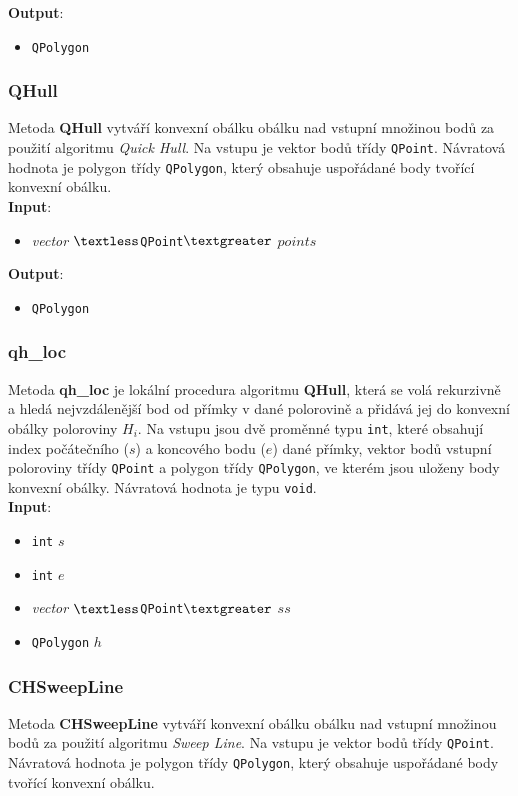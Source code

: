 \documentclass[a4paper, 12pt]{article}
\begin{document}
\textbf{Output}:
\begin{itemize}
\item \texttt{QPolygon}
\end{itemize}

\subsubsection*{QHull}
Metoda \textbf{QHull} vytváří konvexní obálku obálku nad vstupní množinou bodů za použití algoritmu \textit{Quick Hull}. Na vstupu je vektor bodů třídy \texttt{QPoint}. Návratová hodnota je polygon třídy \texttt{QPolygon}, který obsahuje uspořádané body tvořící konvexní obálku.\\

\textbf{Input}:
\begin{itemize}
\item \textsl{vector} $\textless$\texttt{QPoint}$\textgreater$ $points$
\end{itemize}

\textbf{Output}:
\begin{itemize}
\item \texttt{QPolygon}
\end{itemize}

\subsubsection*{qh\_loc}
Metoda \textbf{qh\_loc} je lokální procedura algoritmu \textbf{QHull}, která se volá rekurzivně a hledá nejvzdálenější bod od přímky v dané polorovině a přidává jej do konvexní obálky poloroviny $H_i$. Na vstupu jsou dvě proměnné typu \texttt{int}, které obsahují index počátečního ($s$) a koncového bodu ($e$) dané přímky, vektor bodů vstupní poloroviny třídy \texttt{QPoint} a polygon třídy \texttt{QPolygon}, ve kterém jsou uloženy body konvexní obálky. Návratová hodnota je typu \texttt{void}.\\

\textbf{Input}:
\begin{itemize}
\item \texttt{int} $s$
\item \texttt{int} $e$
\item \textsl{vector} $\textless$\texttt{QPoint}$\textgreater$ $ss$
\item \texttt{QPolygon} $h$
\end{itemize}

\subsubsection*{CHSweepLine}
Metoda \textbf{CHSweepLine} vytváří konvexní obálku obálku nad vstupní množinou bodů za použití algoritmu \textit{Sweep Line}. Na vstupu je vektor bodů třídy \texttt{QPoint}. Návratová hodnota je polygon třídy \texttt{QPolygon}, který obsahuje uspořádané body tvořící konvexní obálku.\\
\end{document}
